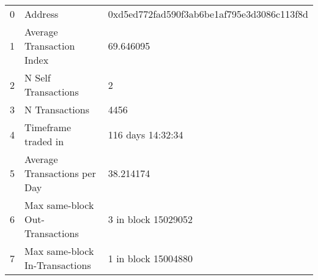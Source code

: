 \begin{tabular}{lll}
\toprule
0 &                          Address &  0xd5ed772fad590f3ab6be1af795e3d3086c113f8d \\
1 &        Average Transaction Index &                                   69.646095 \\
2 &              N Self Transactions &                                           2 \\
3 &                   N Transactions &                                        4456 \\
4 &              Timeframe traded in &                           116 days 14:32:34 \\
5 &     Average Transactions per Day &                                   38.214174 \\
6 &  Max same-block Out-Transactions &                         3 in block 15029052 \\
7 &   Max same-block In-Transactions &                         1 in block 15004880 \\
\bottomrule
\end{tabular}
